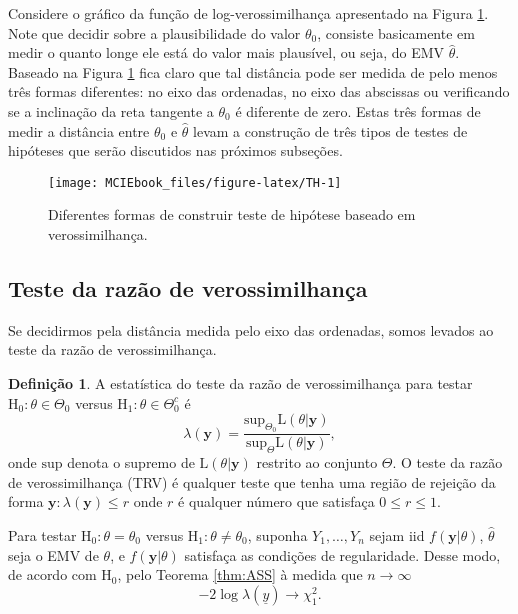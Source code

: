 \documentclass[
  9pt,
  a5paper,
]{book}
\theoremstyle{definition}
\newtheorem{definition}{Definição}[chapter]
\theoremstyle{definition}
\theoremstyle{definition}
\theoremstyle{definition}
\theoremstyle{remark}
\begin{document}
Considere o gráfico da função de log-verossimilhança apresentado na Figura \ref{fig:TH}.
Note que decidir sobre a plausibilidade do valor \(\theta_0\), consiste basicamente em medir o quanto longe ele está do valor mais plausível, ou seja, do EMV \(\hat{\theta}\). Baseado na Figura \ref{fig:TH} fica claro que tal distância pode ser medida de pelo menos três formas diferentes: no eixo das ordenadas, no eixo das abscissas ou verificando se a inclinação da reta tangente a \(\theta_0\) é diferente de zero. Estas três formas de medir a distância entre \(\theta_0\) e \(\hat{\theta}\) levam a construção de três tipos de testes de hipóteses que serão discutidos nas próximos subseções.

\begin{figure}[h]

{\centering \texttt{[image: MCIEbook\_files/figure-latex/TH-1]} 

}

\caption{Diferentes formas de construir teste de hipótese baseado em verossimilhança.}\label{fig:TH}
\end{figure}

\hypertarget{teste-da-razuxe3o-de-verossimilhanuxe7a}{%
\subsection{Teste da razão de verossimilhança}\label{teste-da-razuxe3o-de-verossimilhanuxe7a}}

Se decidirmos pela distância medida pelo eixo das ordenadas, somos levados ao teste da razão de verossimilhança.

\begin{definition}
\protect\hypertarget{def:unnamed-chunk-19}{}\label{def:unnamed-chunk-19}A estatística do teste da razão de verossimilhança para testar \(\mathrm{H_0}: \theta \in \Theta_0\) versus \(\mathrm{H_1} : \theta \in \Theta_0^c\) é
\[ \lambda(\mathbf{y}) = \frac{\mathrm{sup}_{\Theta_0} \mathrm{L}(\theta | \mathbf{y})} {\mathrm{sup}_{\Theta} \mathrm{L}(\theta | \mathbf{y})},\] onde \(\mathrm{sup}\) denota o supremo de \(\mathrm{L}(\theta | \mathbf{y})\) restrito ao conjunto \(\Theta\).
O teste da razão de verossimilhança (TRV) é qualquer teste que tenha uma região de rejeição da forma \({\mathbf{y} : \lambda(\mathbf{y}) \leq r}\) onde \(r\) é qualquer número que satisfaça \(0 \leq r \leq 1\).
\end{definition}

Para testar \(\mathrm{H_0}: \theta = \theta_0\) versus \(\mathrm{H_1}: \theta \neq \theta_0\), suponha \(Y_1, \ldots, Y_n\) sejam iid \(f(\mathbf{y}|\theta)\), \(\hat{\theta}\) seja o EMV de \(\theta\), e \(f(\mathbf{y}|\theta)\) satisfaça as condições de regularidade. Desse modo, de acordo com \(\mathrm{H_0}\), pelo Teorema \ref{thm:ASS} à medida que \(n \to \infty\)
\[ -2 \log \lambda(\underline{y}) \to \chi^2_1. \]
\end{document}
